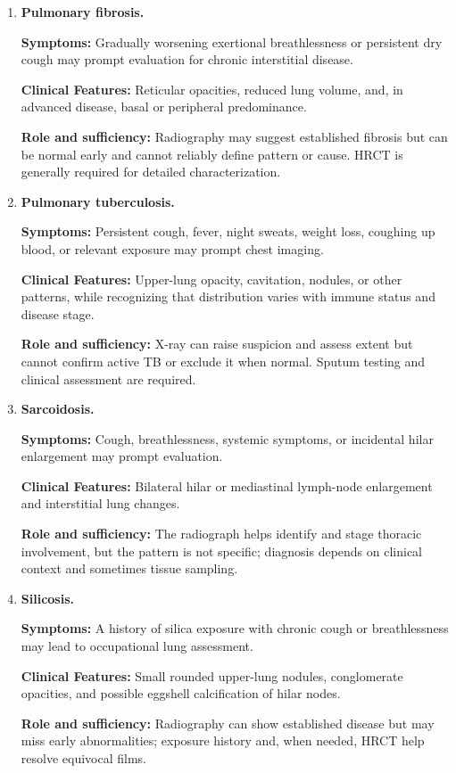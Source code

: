 \begin{enumerate}[leftmargin=*,itemsep=0.45em,topsep=0.4em]
\item \textbf{Pulmonary fibrosis.}\par\noindent\textbf{Symptoms:} Gradually worsening exertional breathlessness or persistent dry cough may prompt evaluation for chronic interstitial disease.\par\noindent\textbf{Clinical Features:} Reticular opacities, reduced lung volume, and, in advanced disease, basal or peripheral predominance.\par\noindent\textbf{Role and sufficiency:} Radiography may suggest established fibrosis but can be normal early and cannot reliably define pattern or cause. HRCT is generally required for detailed characterization.
\item \textbf{Pulmonary tuberculosis.}\par\noindent\textbf{Symptoms:} Persistent cough, fever, night sweats, weight loss, coughing up blood, or relevant exposure may prompt chest imaging.\par\noindent\textbf{Clinical Features:} Upper-lung opacity, cavitation, nodules, or other patterns, while recognizing that distribution varies with immune status and disease stage.\par\noindent\textbf{Role and sufficiency:} X-ray can raise suspicion and assess extent but cannot confirm active TB or exclude it when normal. Sputum testing and clinical assessment are required.
\item \textbf{Sarcoidosis.}\par\noindent\textbf{Symptoms:} Cough, breathlessness, systemic symptoms, or incidental hilar enlargement may prompt evaluation.\par\noindent\textbf{Clinical Features:} Bilateral hilar or mediastinal lymph-node enlargement and interstitial lung changes.\par\noindent\textbf{Role and sufficiency:} The radiograph helps identify and stage thoracic involvement, but the pattern is not specific; diagnosis depends on clinical context and sometimes tissue sampling.
\item \textbf{Silicosis.}\par\noindent\textbf{Symptoms:} A history of silica exposure with chronic cough or breathlessness may lead to occupational lung assessment.\par\noindent\textbf{Clinical Features:} Small rounded upper-lung nodules, conglomerate opacities, and possible eggshell calcification of hilar nodes.\par\noindent\textbf{Role and sufficiency:} Radiography can show established disease but may miss early abnormalities; exposure history and, when needed, HRCT help resolve equivocal films.
\end{enumerate}

